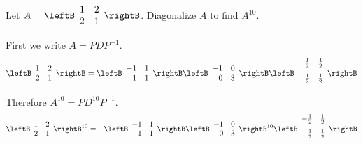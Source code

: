 \begin{enumialphparenastyle}
 
\begin{ex} Let $A = \leftB \begin{array}{rr}
1 & 2 \\
2 & 1 
\end{array} \rightB$. Diagonalize $A$ to find $A^{10}$. 
\begin{sol}
First we write $A = PDP^{-1}$. 
\[
\leftB
\begin{array}{rr}
1 & 2 \\
2 & 1 
\end{array}
\rightB 
 = 
\leftB
\begin{array}{rr}
-1 & 1 \\
1 & 1 
\end{array}
\rightB 
\leftB
\begin{array}{rr}
-1 & 0 \\
0 & 3 
\end{array}
\rightB 
\leftB
\begin{array}{rr}
-\vspace{0.05in}\frac{1}{2} & \vspace{0.05in}\frac{1}{2} \\
\vspace{0.05in}\frac{1}{2} & \vspace{0.05in}\frac{1}{2} 
\end{array}
\rightB 
\]
Therefore $A^{10} = PD^{10}P^{-1}$. 
\begin{eqnarray*}
\leftB
\begin{array}{rr}
1 & 2 \\
2 & 1 
\end{array}
\rightB ^{10}
 &=& 
\leftB
\begin{array}{rr}
-1 & 1 \\
1 & 1 
\end{array}
\rightB 
\leftB
\begin{array}{rr}
-1 & 0 \\
0 & 3 
\end{array}
\rightB^{10}
\leftB
\begin{array}{rr}
-\vspace{0.05in}\frac{1}{2} & \vspace{0.05in}\frac{1}{2} \\
\vspace{0.05in}\frac{1}{2} & \vspace{0.05in}\frac{1}{2} 
\end{array}
\rightB \\

\end{eqnarray*}
\end{sol}
\end{ex}
\end{enumialphparenastyle}
